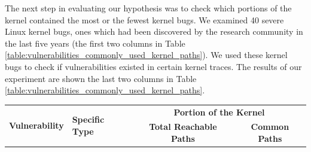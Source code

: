 The next step in evaluating our hypothesis was to check which portions of the kernel contained 
the most or the fewest kernel bugs. We examined 40 severe Linux kernel bugs, 
ones which had been discovered by the research community in the last five years (the first two columns in Table 
\ref{table:vulnerabilities_commonly_used_kernel_paths}). 
We used these kernel bugs to check if vulnerabilities existed in certain kernel traces. 
The results of our experiment are shown the last two columns in Table \ref{table:vulnerabilities_commonly_used_kernel_paths}.

\begin{table}[!ht]
\scriptsize
\centering
\begin{tabular}{|l|l|c|c|}\hline
\multirow{2}{*}{\textbf{Vulnerability}} & \multirow{2}{*}{\textbf{Specific Type}} & \multicolumn{2}{c|}{\bf Portion of the Kernel} \\
\cline{3-4}
&  & \textbf{Total Reachable Paths} &  \textbf{Common Paths} \\ \hline


\end{tabular}
\end{table}
